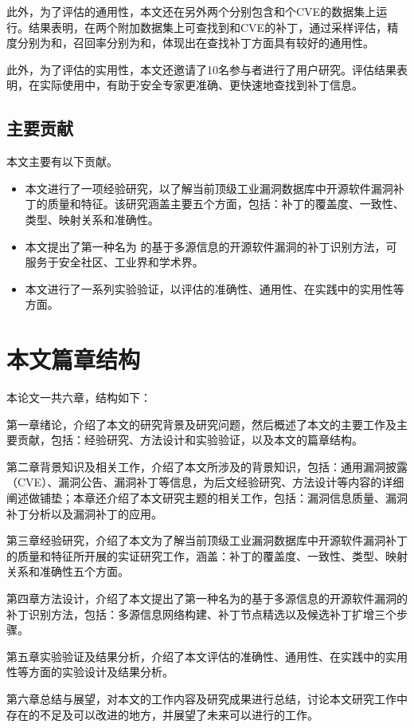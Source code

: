 此外，为了评估\tool 的通用性，本文还在另外两个分别包含和个CVE的数据集上运行\tool 。结果表明，\tool 在两个附加数据集上可查找到和CVE的补丁，通过采样评估，精度分别为和，召回率分别为和，体现出\tool 在查找补丁方面具有较好的通用性。

此外，为了评估\tool 的实用性，本文还邀请了10名参与者进行了用户研究。评估结果表明，在实际使用中，\tool 有助于安全专家更准确、更快速地查找到补丁信息。

\subsection{主要贡献}
本文主要有以下贡献。
\begin{itemize}[leftmargin=*]
\item 本文进行了一项经验研究，以了解当前顶级工业漏洞数据库中开源软件漏洞补丁的质量和特征。该研究涵盖主要五个方面，包括：补丁的覆盖度、一致性、类型、映射关系和准确性。
\item 本文提出了第一种名为 \tool 的基于多源信息的开源软件漏洞的补丁识别方法，可服务于安全社区、工业界和学术界。
\item 本文进行了一系列实验验证，以评估\tool 的准确性、通用性、在实践中的实用性等方面。
\end{itemize}


\section{本文篇章结构}
本论文一共六章，结构如下：

第一章绪论，介绍了本文的研究背景及研究问题，然后概述了本文的主要工作及主要贡献，包括：经验研究、方法设计和实验验证，以及本文的篇章结构。

第二章背景知识及相关工作，介绍了本文所涉及的背景知识，包括：通用漏洞披露（CVE）、漏洞公告、漏洞补丁等信息，为后文经验研究、方法设计等内容的详细阐述做铺垫；本章还介绍了本文研究主题的相关工作，包括：漏洞信息质量、漏洞补丁分析以及漏洞补丁的应用。

第三章经验研究，介绍了本文为了解当前顶级工业漏洞数据库中开源软件漏洞补丁的质量和特征所开展的实证研究工作，涵盖：补丁的覆盖度、一致性、类型、映射关系和准确性五个方面。

第四章\tool 方法设计，介绍了本文提出了第一种名为\tool 的基于多源信息的开源软件漏洞的补丁识别方法，包括：多源信息网络构建、补丁节点精选以及候选补丁扩增三个步骤。

第五章实验验证及结果分析，介绍了本文评估\tool 的准确性、通用性、在实践中的实用性等方面的实验设计及结果分析。 

第六章总结与展望，对本文的工作内容及研究成果进行总结，讨论本文研究工作中存在的不足及可以改进的地方，并展望了未来可以进行的工作。
